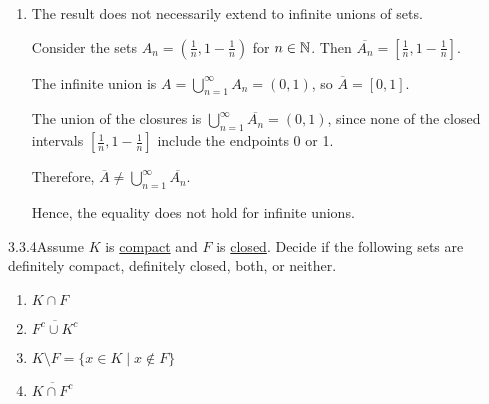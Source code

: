 {\begin{enumerate}
{\begin{itemize}
                            \item Similarly, if \(x \in \overline{B}\), then \(x \in \overline{A \cup B}\).
                \end{itemize}
                
                            Therefore, \(\overline{A} \cup \overline{B} \subseteq \overline{A \cup B}\).
        }{
            Hence, \(\overline{A \cup B} = \overline{A} \cup \overline{B}\).
        }{xgray}
        \item The result does not necessarily extend to infinite unions of sets.

        Consider the sets \(A_n = \left( \frac{1}{n}, 1 - \frac{1}{n} \right)\) for \(n \in \mathbb{N}\). Then \(\overline{A_n} = \left[ \frac{1}{n}, 1 - \frac{1}{n} \right]\).

        The infinite union is \(A = \bigcup_{n=1}^\infty A_n = (0,1)\), so \(\overline{A} = [0,1]\).

        The union of the closures is \(\bigcup_{n=1}^\infty \overline{A_n} = (0,1)\), since none of the closed intervals \(\left[ \frac{1}{n}, 1 - \frac{1}{n} \right]\) include the endpoints 0 or 1.

        Therefore, \(\overline{A} \ne \bigcup_{n=1}^\infty \overline{A_n}\).

        Hence, the equality does not hold for infinite unions.

    \end{enumerate}
}

\begin{exercise}
    {3.3.4}Assume \(K\) is \hyperref[def:3.3.1]{compact} and \(F\) is \hyperref[def:3.2.5]{closed}. Decide if the following sets are definitely compact, definitely closed, both, or neither. 
    \begin{enumerate}
        \item \(K \cap F\)
        \item \(\overline{F^c \cup K^c}\)
        \item \(K \setminus F = \{x \in K \mid x \notin F\}\)
        \item \(\overline{K \cap F^c}\)
    \end{enumerate}
\end{exercise}

